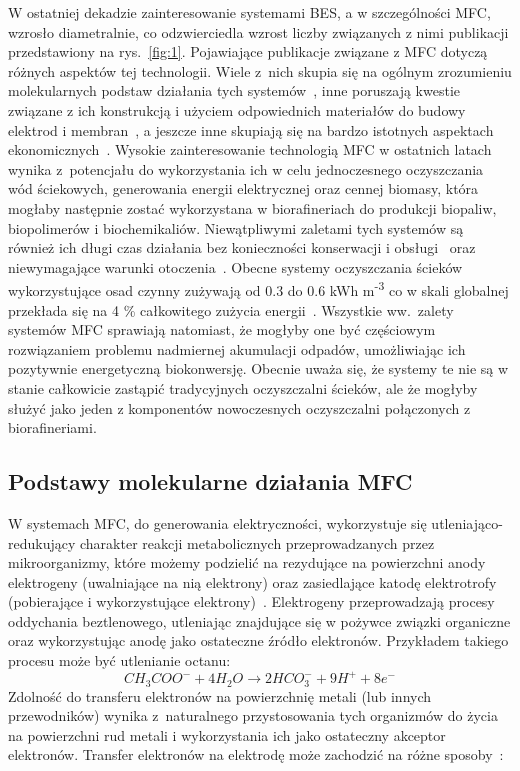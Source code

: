 W ostatniej dekadzie zainteresowanie systemami BES,
a w szczególności MFC, wzrosło diametralnie, co odzwierciedla wzrost
liczby związanych z nimi publikacji przedstawiony na rys.~\ref{fig:1}.
Pojawiające publikacje związane z MFC
dotyczą różnych aspektów tej technologii.
Wiele z~nich skupia się na ogólnym zrozumieniu molekularnych podstaw
działania tych systemów~\cite{Slate2019, Bruce2006, Lovley2006}, inne
poruszają kwestie związane z ich konstrukcją i użyciem odpowiednich
materiałów do budowy elektrod i membran~\cite{Kaur2020, Daud2015},
a jeszcze inne skupiają się na bardzo istotnych
aspektach ekonomicznych~\cite{Trapero2017}.
Wysokie zainteresowanie technologią MFC w ostatnich latach wynika
z~potencjału do wykorzystania ich w celu jednoczesnego oczyszczania
wód ściekowych, generowania energii elektrycznej oraz cennej biomasy,
która mogłaby następnie zostać wykorzystana w biorafineriach do produkcji
biopaliw, biopolimerów i biochemikaliów.
Niewątpliwymi zaletami tych systemów są również ich długi czas działania
bez konieczności konserwacji i obsługi~\cite{Habermann1991}
oraz niewymagające warunki otoczenia~\cite{Slate2019}.
Obecne systemy oczyszczania ścieków wykorzystujące osad czynny
zużywają od 0.3 do 0.6 kWh m\textsuperscript{-3} co w skali globalnej
przekłada się na 4 \% całkowitego zużycia energii~\cite{AlSayed2020}.
Wszystkie ww.\ zalety systemów MFC sprawiają natomiast, że mogłyby one
być częściowym rozwiązaniem problemu nadmiernej akumulacji odpadów,
umożliwiając ich pozytywnie energetyczną biokonwersję.
Obecnie uważa się, że systemy te nie są w stanie całkowicie zastąpić
tradycyjnych oczyszczalni ścieków, ale że mogłyby służyć
jako jeden z komponentów nowoczesnych oczyszczalni połączonych
z biorafineriami.

\subsection{Podstawy molekularne działania MFC}\label{subsec:podstawy-molekularne}
W systemach MFC, do generowania elektryczności, wykorzystuje się
utleniająco-redukujący charakter reakcji metabolicznych
przeprowadzanych przez mikroorganizmy, które możemy podzielić
na rezydujące na powierzchni anody elektrogeny (uwalniające na nią
elektrony) oraz zasiedlające katodę elektrotrofy
(pobierające i wykorzystujące elektrony)~\cite{AlSayed2020}.
Elektrogeny przeprowadzają procesy oddychania beztlenowego,
utleniając znajdujące się w pożywce związki organiczne oraz
wykorzystując anodę jako ostateczne źródło elektronów.
Przykładem takiego procesu może być utlenianie octanu:
\begin{equation}
    \label{eq:1}
    CH_3 COO^- + 4H_2 O \rightarrow 2HCO_3^- + 9H^+ + 8e^-
\end{equation}
Zdolność do transferu elektronów na powierzchnię metali (lub
innych przewodników) wynika z~naturalnego przystosowania tych
organizmów do życia na powierzchni rud metali i wykorzystania
ich jako ostateczny akceptor elektronów.
Transfer elektronów na elektrodę może zachodzić na różne
sposoby~\cite{Santoro2017}:

